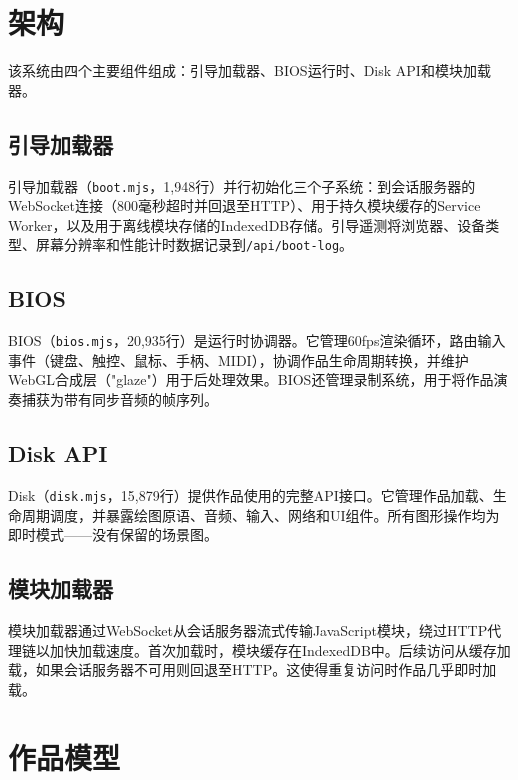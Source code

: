 \documentclass[10pt,letterpaper,twocolumn]{article}
\begin{document}

\section{架构}
\label{sec:architecture}

该系统由四个主要组件组成：引导加载器、BIOS运行时、Disk API和模块加载器。

\subsection{引导加载器}

引导加载器（\texttt{boot.mjs}，1,948行）并行初始化三个子系统：到会话服务器的WebSocket连接（800毫秒超时并回退至HTTP）、用于持久模块缓存的Service Worker，以及用于离线模块存储的IndexedDB存储。引导遥测将浏览器、设备类型、屏幕分辨率和性能计时数据记录到\texttt{/api/boot-log}。

\subsection{BIOS}

BIOS（\texttt{bios.mjs}，20,935行）是运行时协调器。它管理60fps渲染循环，路由输入事件（键盘、触控、鼠标、手柄、MIDI），协调作品生命周期转换，并维护WebGL合成层（"glaze"）用于后处理效果。BIOS还管理录制系统，用于将作品演奏捕获为带有同步音频的帧序列。

\subsection{Disk API}

Disk（\texttt{disk.mjs}，15,879行）提供作品使用的完整API接口。它管理作品加载、生命周期调度，并暴露绘图原语、音频、输入、网络和UI组件。所有图形操作均为即时模式——没有保留的场景图。

\subsection{模块加载器}

模块加载器通过WebSocket从会话服务器流式传输JavaScript模块，绕过HTTP代理链以加快加载速度。首次加载时，模块缓存在IndexedDB中。后续访问从缓存加载，如果会话服务器不可用则回退至HTTP。这使得重复访问时作品几乎即时加载。


\section{作品模型}
\label{sec:pieces}
\end{document}
